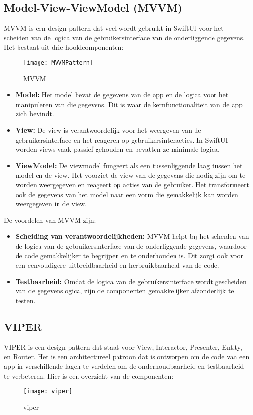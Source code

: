 \subsection{Model-View-ViewModel (MVVM)}
\autocite{MediumMVVM} MVVM is een design pattern dat veel wordt gebruikt in SwiftUI voor het scheiden van de logica van de gebruikersinterface van de onderliggende gegevens. Het bestaat uit drie hoofdcomponenten:
\begin{figure}[htbp]
    \centering
    \texttt{[image: MVVMPattern]} 
    \caption{MVVM}
    \label{fig:mvvm}
\end{figure}
\begin{itemize}
    \item {\textbf{Model:} Het model bevat de gegevens van de app en de logica voor het manipuleren van die gegevens. Dit is waar de kernfunctionaliteit van de app zich bevindt.}
    \item {\textbf{View:} De view is verantwoordelijk voor het weergeven van de gebruikersinterface en het reageren op gebruikersinteracties. In SwiftUI worden views vaak passief gehouden en bevatten ze minimale logica.}
    \item {\textbf{ViewModel:} De viewmodel fungeert als een tussenliggende laag tussen het model en de view. Het voorziet de view van de gegevens die nodig zijn om te worden weergegeven en reageert op acties van de gebruiker. Het transformeert ook de gegevens van het model naar een vorm die gemakkelijk kan worden weergegeven in de view.}
\end{itemize}
De voordelen van MVVM zijn:
\begin{itemize}
    \item {\textbf{Scheiding van verantwoordelijkheden:} MVVM helpt bij het scheiden van de logica van de gebruikersinterface van de onderliggende gegevens, waardoor de code gemakkelijker te begrijpen en te onderhouden is. Dit zorgt ook voor een eenvoudigere uitbreidbaarheid en herbruikbaarheid van de code.}
    \item {\textbf{Testbaarheid:} Omdat de logica van de gebruikersinterface wordt gescheiden van de gegevenslogica, zijn de componenten gemakkelijker afzonderlijk te testen.}
\end{itemize}

\subsection{VIPER}
\autocite{MediumVIPER} VIPER is een design pattern dat staat voor View, Interactor, Presenter, Entity, en Router. Het is een architectureel patroon dat is ontworpen om de code van een app in verschillende lagen te verdelen om de onderhoudbaarheid en testbaarheid te verbeteren. Hier is een overzicht van de componenten:
\begin{figure}[htbp]
    \centering
    \texttt{[image: viper]} 
    \caption{viper}
    \label{fig:viper}
\end{figure}

